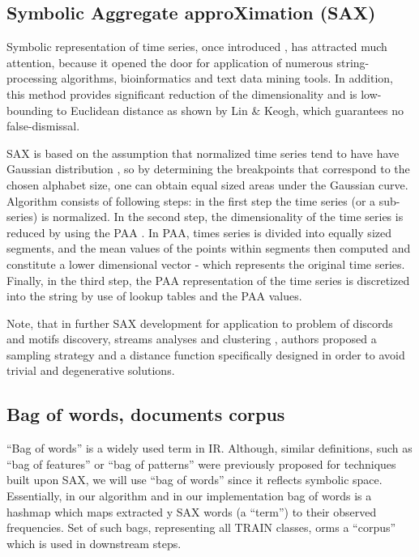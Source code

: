 \documentclass{llncs}
\begin{document}
\subsection{Symbolic Aggregate approXimation (SAX)}
Symbolic representation of time series, once introduced \cite{sax}, has attracted much attention,
because it opened the door for application of numerous string-processing algorithms, bioinformatics
and text data mining tools. In addition, this method provides significant reduction of the
dimensionality and is low-bounding to Euclidean distance as shown by Lin \& Keogh, which guarantees
no false-dismissal.

SAX is based on the assumption that normalized time series tend to have have Gaussian distribution
\cite{larsen_marx}, so by determining the breakpoints that correspond to the chosen alphabet
size, one can obtain equal sized areas under the Gaussian curve. Algorithm consists of following
steps: in the first step the time series (or a sub-series) is normalized. In the second step, the
dimensionality of the time series is reduced by using the PAA \cite{paa}. In PAA, times series is
divided into equally sized segments, and the mean values of the points within segments then computed
and constitute a lower dimensional vector - which represents the original time series. Finally, in
the third step, the PAA representation of the time series is discretized into the string by use of
lookup tables and the PAA values.

Note, that in further SAX development \cite{hot_sax}for application to problem of discords
and motifs discovery, streams analyses and clustering \cite{streaming_sax}, authors
proposed a sampling strategy and a distance function specifically designed in order to avoid trivial
and degenerative solutions. 

\subsection{Bag of words, documents corpus}
“Bag of words” is a widely used term in IR. Although, similar definitions, such as “bag of features”
\cite{bag_features} or “bag of patterns” \cite{bag_patterns} were previously proposed for techniques
built upon SAX, we  will use “bag of words” since it reflects symbolic space. Essentially, in our
algorithm                                                                                      and
in our implementation bag of words is a hashmap which maps extracted y SAX words (a
“term”) to their observed frequencies. Set of such bags, representing all TRAIN classes, orms a
“corpus” which is used in downstream steps.
\end{document}
